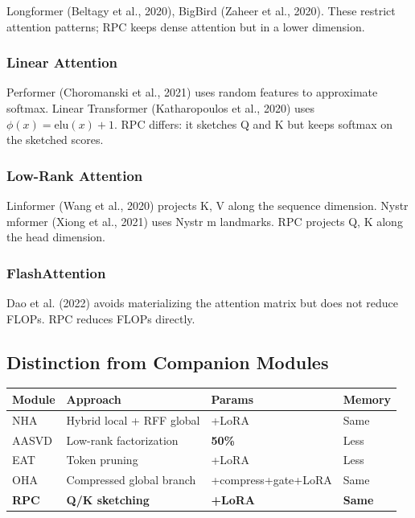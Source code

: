 Longformer (Beltagy et al., 2020), BigBird (Zaheer et al., 2020). These 
restrict attention patterns; RPC keeps dense attention but in a lower 
dimension.

\subsubsection{Linear Attention}

Performer (Choromanski et al., 2021) uses random features to approximate 
softmax. Linear Transformer (Katharopoulos et al., 2020) uses $\phi(x) = \text{elu}(x) + 1$. 
RPC differs: it sketches Q and K but keeps softmax on the sketched scores.

\subsubsection{Low-Rank Attention}

Linformer (Wang et al., 2020) projects K, V along the sequence dimension. 
Nystr mformer (Xiong et al., 2021) uses Nystr m landmarks. RPC projects 
Q, K along the head dimension.

\subsubsection{FlashAttention}

Dao et al. (2022) avoids materializing the attention matrix but does not 
reduce FLOPs. RPC reduces FLOPs directly.

\subsection{Distinction from Companion Modules}

\begin{table}[H]
\centering
\small
\begin{tabular}{llll}
\toprule
\textbf{Module} & \textbf{Approach} & \textbf{Params} & \textbf{Memory} \\
\midrule
NHA & Hybrid local + RFF global & +LoRA & Same \\
AASVD & Low-rank factorization & \textbf{ 50\%} & Less \\
EAT & Token pruning & +LoRA & Less \\
OHA & Compressed global branch & +compress+gate+LoRA & Same \\
\textbf{RPC} & \textbf{Q/K sketching} & \textbf{+LoRA} & \textbf{Same} \\
\bottomrule
\end{tabular}
\end{table}

